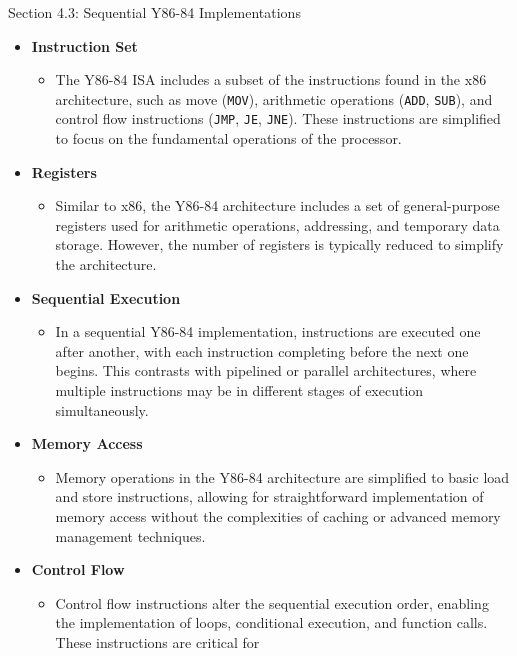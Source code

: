 \begin{notes}{Section 4.3: Sequential Y86-84 Implementations}
    \begin{itemize}
        \item \textbf{Instruction Set}
        \begin{itemize}
            \item The Y86-84 ISA includes a subset of the instructions found in the x86 architecture, such as move (\texttt{MOV}), arithmetic operations (\texttt{ADD}, \texttt{SUB}), and control flow 
            instructions (\texttt{JMP}, \texttt{JE}, \texttt{JNE}). These instructions are simplified to focus on the fundamental operations of the processor.
        \end{itemize}
        \item \textbf{Registers}
        \begin{itemize}
            \item Similar to x86, the Y86-84 architecture includes a set of general-purpose registers used for arithmetic operations, addressing, and temporary data storage. However, the number of 
            registers is typically reduced to simplify the architecture.
        \end{itemize}
        \item \textbf{Sequential Execution}
        \begin{itemize}
            \item In a sequential Y86-84 implementation, instructions are executed one after another, with each instruction completing before the next one begins. This contrasts with pipelined or 
            parallel architectures, where multiple instructions may be in different stages of execution simultaneously.
        \end{itemize}
        \item \textbf{Memory Access}
        \begin{itemize}
            \item Memory operations in the Y86-84 architecture are simplified to basic load and store instructions, allowing for straightforward implementation of memory access without the complexities 
            of caching or advanced memory management techniques.
        \end{itemize}
        \item \textbf{Control Flow}
        \begin{itemize}
            \item Control flow instructions alter the sequential execution order, enabling the implementation of loops, conditional execution, and function calls. These instructions are critical for 

\end{itemize}
\end{itemize}
\end{notes}
